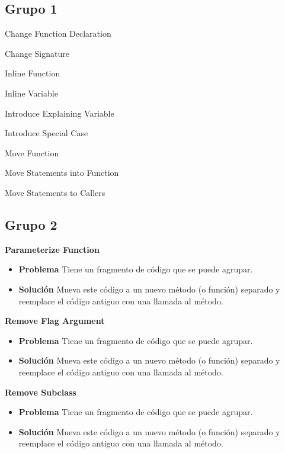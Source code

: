 \documentclass[11pt,a4paper,oneside]{book}
\begin{document}
\subsection{Grupo 1}
Change Function Declaration

Change Signature 

Inline Function

Inline Variable

Introduce Explaining Variable

Introduce Special Case

Move Function

Move Statements into Function

Move Statements to Callers


\subsection{Grupo 2}
\textbf{Parameterize Function}

\begin{itemize}
    \item \textbf{Problema} Tiene un fragmento de código que se puede agrupar.
    \item \textbf{Solución} Mueva este código a un nuevo método (o función) separado y reemplace el código antiguo con una llamada al método.
\end{itemize}


\textbf{Remove Flag Argument}

\begin{itemize}
    \item \textbf{Problema} Tiene un fragmento de código que se puede agrupar.
    \item \textbf{Solución} Mueva este código a un nuevo método (o función) separado y reemplace el código antiguo con una llamada al método.
\end{itemize}


\textbf{Remove Subclass}

\begin{itemize}
    \item \textbf{Problema} Tiene un fragmento de código que se puede agrupar.
    \item \textbf{Solución} Mueva este código a un nuevo método (o función) separado y reemplace el código antiguo con una llamada al método.
\end{itemize}
\end{document}

